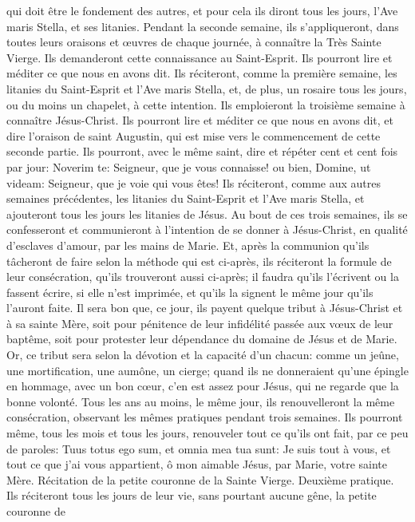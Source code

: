 qui doit être le fondement des autres, et pour cela ils diront tous les jours, l'Ave maris Stella, et ses litanies.
 Pendant la seconde semaine, ils s'appliqueront, dans toutes leurs oraisons et œuvres de chaque journée, à
connaître la Très Sainte Vierge. Ils demanderont cette connaissance au Saint-Esprit. Ils pourront lire et méditer ce
que nous en avons dit. Ils réciteront, comme la première semaine, les litanies du Saint-Esprit et l'Ave maris Stella,
et, de plus, un rosaire tous les jours, ou du moins un chapelet, à cette intention.
 Ils emploieront la troisième semaine à connaître Jésus-Christ. Ils pourront lire et méditer ce que nous en
avons dit, et dire l'oraison de saint Augustin, qui est mise vers le commencement de cette seconde partie. Ils
pourront, avec le même saint, dire et répéter cent et cent fois par jour: Noverim te: Seigneur, que je vous
connaisse! ou bien, Domine, ut videam: Seigneur, que je voie qui vous êtes! Ils réciteront, comme aux autres
semaines précédentes, les litanies du Saint-Esprit et l'Ave maris Stella, et ajouteront tous les jours les litanies de
Jésus.
 Au bout de ces trois semaines, ils se confesseront et communieront à l'intention de se donner à Jésus-Christ,
en qualité d'esclaves d'amour, par les mains de Marie. Et, après la communion qu'ils tâcheront de faire selon la
méthode qui est ci-après, ils réciteront la formule de leur consécration, qu'ils trouveront aussi ci-après; il faudra
qu'ils l'écrivent ou la fassent écrire, si elle n'est imprimée, et qu'ils la signent le même jour qu'ils l'auront faite.
 Il sera bon que, ce jour, ils payent quelque tribut à Jésus-Christ et à sa sainte Mère, soit pour pénitence de
leur infidélité passée aux vœux de leur baptême, soit pour protester leur dépendance du domaine de Jésus et de
Marie. Or, ce tribut sera selon la dévotion et la capacité d'un chacun: comme un jeûne, une mortification, une
aumône, un cierge; quand ils ne donneraient qu'une épingle en hommage, avec un bon cœur, c'en est assez pour
Jésus, qui ne regarde que la bonne volonté.
 Tous les ans au moins, le même jour, ils renouvelleront la même consécration, observant les mêmes
pratiques pendant trois semaines.
Ils pourront même, tous les mois et tous les jours, renouveler tout ce qu'ils ont fait, par ce peu de paroles: Tuus
totus ego sum, et omnia mea tua sunt: Je suis tout à vous, et tout ce que j'ai vous appartient, ô mon aimable
Jésus, par Marie, votre sainte Mère.
Récitation de la petite couronne de la Sainte Vierge.
 Deuxième pratique. Ils réciteront tous les jours de leur vie, sans pourtant aucune gêne, la petite couronne de
